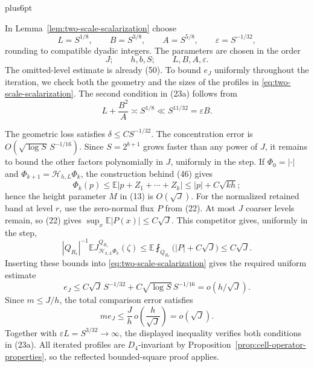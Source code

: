 \documentclass[11pt,reqno]{amsart}
\makeatletter
\theoremstyle{plain}
\theoremstyle{definition}
\theoremstyle{remark}
\renewenvironment{proof}[1][\proofname]{%
  \par
  \pushQED{\qed}%
  \normalfont
  \topsep6pt plus6pt\relax
  \trivlist
  \item[\hskip\labelsep\slshape #1\@addpunct{.}]%
  \ignorespaces
}{%
  \popQED
  \endtrivlist
  \@endpefalse
}
\DeclareRobustCommand{\qed}{%
  \leavevmode\unskip\penalty9999\hbox{}\nobreak
  \ifmmode
    \makebox[0pt][l]{\qquad\hbox{\qedsymbol}}%
  \else
    \qquad\hbox{\qedsymbol}%
  \fi
}
\renewcommand{\qedsymbol}{\rule[.47pt]{4pt}{6pt}}
\numberwithin{equation}{section}
\newcommand{\1}{\mathbf 1}
\makeatother
\begin{document}
\begin{proof}
In Lemma~\ref{lem:two-scale-scalarization} choose
\begin{equation}
L=S^{1/8},\qquad B=S^{3/8},\qquad A=S^{5/8},
\qquad\varepsilon=S^{-1/32},
\tag{51}
\end{equation}
rounding to compatible dyadic integers.  The parameters are chosen in
the order
\[
J;\qquad h,b,S;\qquad L,B,A,\varepsilon.
\]
The omitted-level estimate is already (50).  To bound $e_J$ uniformly
throughout the iteration, we check both the geometry and the sizes of
the profiles in \eqref{eq:two-scale-scalarization}.  The second
condition in (23a) follows from
\begin{equation*}
L+\frac{B^2}{A}\asymp S^{1/8}
\ll S^{11/32}=\varepsilon B.
\end{equation*}

The geometric loss satisfies $\delta\leq CS^{-1/32}$.
The concentration error is $O(\sqrt{\log S}\,S^{-1/16})$.
Since $S=2^{b+1}$ grows faster than any power of $J$, it remains to
bound the other factors polynomially in $J$, uniformly in the step.
If
$\Phi_ 0=|\cdot|$ and
$\Phi_ {k+1}=\mathcal H_ {h,L}\Phi_ k$, the construction behind (46)
gives
\begin{equation}
\Phi_ k(p)\leq\mathbb E|p+Z_ 1+\cdots+Z_ k|
\leq |p|+C\sqrt{kh};
\tag{52}
\end{equation}
hence the height parameter $M$ in (13) is $O(\sqrt J)$.
For the normalized retained band at level $r$, use the zero-normal
flux $P$ from (22).  At most $J$ coarser levels remain, so (22) gives
$\sup_x\mathbb E|P(x)|\leq C\sqrt J$.  This competitor gives,
uniformly in the step,
\begin{equation}
|Q_{R_r}|^{-1}\mathbb EJ_ {\mathcal H_ {h,L}\Phi_ k}^{Q_{R_r}}(\zeta)
\leq\mathbb E\fint_{Q_{R_r}}\bigl(|P|+C\sqrt J\bigr)\leq C\sqrt J.
\tag{52a}
\end{equation}
Inserting these bounds into \eqref{eq:two-scale-scalarization} gives
the required uniform estimate
\begin{equation}
e_ J\leq C\sqrt J\,S^{-1/32}
+C\sqrt{\log S}\,S^{-1/16}=o(h/\sqrt J).
\tag{52b}
\end{equation}
Since $m\leq J/h$, the total comparison error satisfies
\begin{equation*}
m e_J\leq\frac{J}{h}\,
o\!\left(\frac{h}{\sqrt J}\right)=o(\sqrt J).
\end{equation*}
Together with $\varepsilon L=S^{3/32}\to\infty$, the displayed
inequality verifies both conditions in (23a).
All iterated profiles are $D_ 4$-invariant by Proposition~\ref{prop:cell-operator-properties}, so the reflected bounded-square proof applies.


\end{proof}
\end{document}
